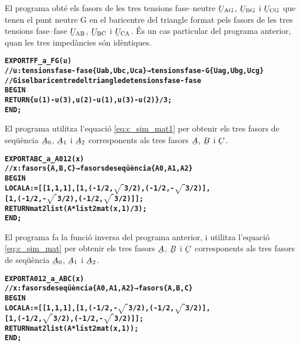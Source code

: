 El programa  obté els fasors de les tres tensions fase--neutre $\cmplx{U}\ped{AG}$, $\cmplx{U}\ped{BG}$ i $\cmplx{U}\ped{CG}$ que tenen el punt neutre G en el baricentre del triangle format pels fasors de  les tres tensions fase--fase
$\cmplx{U}\ped{AB}$, $\cmplx{U}\ped{BC}$ i $\cmplx{U}\ped{CA}$. És un cas particular del programa anterior, quan les tres impedàncies són idèntiques.
\vspace{-1cm}
\begin{alltt}
\bfseries
{}
    EXPORT FF_a_FG(u)
    // u:tensions fase-fase \{Uab,Ubc,Uca\} → tensions fase-G \{Uag,Ubg,Ucg\}
    // G is el baricentre del triangle de tensions fase-fase
    BEGIN
      RETURN \{u(1)-u(3),u(2)-u(1),u(3)-u(2)\}/3;
    END;
\end{alltt}

El programa  utilitza l'equació \eqref{eq:c_sim_mat1} per obtenir els tres fasors de seqüència
$\cmplx{A}_0$, $\cmplx{A}_1$ i  $\cmplx{A}_2$ corresponents als tres fasors $\cmplx{A}$, $\cmplx{B}$ i $\cmplx{C}$.
\vspace{-1cm}
\begin{alltt}
\bfseries
{}
    EXPORT ABC_a_A012(x)
    // x:fasors \{A,B,C\} → fasors de seqüència \{A0,A1,A2\}
    BEGIN
      LOCAL A:=[[1,1,1],[1,(-1/2,\(\sqrt{\phantom{|}}\)3/2),(-1/2,-\(\sqrt{\phantom{|}}\)3/2)],
                [1,(-1/2,-\(\sqrt{\phantom{|}}\)3/2),(-1/2,\(\sqrt{\phantom{|}}\)3/2)]];
      RETURN mat2list(A*list2mat(x,1)/3);
    END;
\end{alltt}

El programa  fa la funció inversa del programa anterior, i utilitza l'equació \eqref{eq:c_sim_mat} per obtenir els tres fasors
$\cmplx{A}$, $\cmplx{B}$ i $\cmplx{C}$  corresponents als tres fasors de seqüència
$\cmplx{A}_0$, $\cmplx{A}_1$ i  $\cmplx{A}_2$.
\vspace{-1cm}
\begin{alltt}
\bfseries
{}
    EXPORT A012_a_ABC(x)
    // x:fasors de seqüència \{A0,A1,A2\} → fasors \{A,B,C\}
    BEGIN
      LOCAL A:=[[1,1,1],[1,(-1/2,-\(\sqrt{\phantom{|}}\)3/2),(-1/2,\(\sqrt{\phantom{|}}\)3/2)],
                [1,(-1/2,\(\sqrt{\phantom{|}}\)3/2),(-1/2,-\(\sqrt{\phantom{|}}\)3/2)]];
      RETURN mat2list(A*list2mat(x,1));
    END;
\end{alltt}

